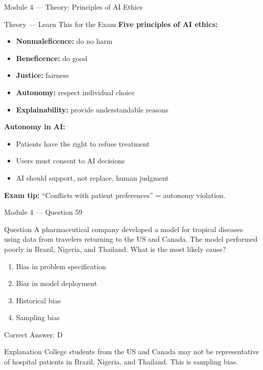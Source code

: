 \documentclass[aspectratio=169,10pt]{beamer}
\newcommand{\question}[1]{%
	\begin{block}{Question}
		#1
	\end{block}
}
\newcommand{\options}[4]{%
	\begin{enumerate}[label=\Alph*.,leftmargin=*]
		\item #1
		\item #2
		\item #3
		\item #4
	\end{enumerate}
}
\newcommand{\answerbox}[1]{%
	\begin{exampleblock}{Correct Answer: #1}
	\end{exampleblock}
}
\newcommand{\explain}[1]{%
	\begin{block}{Explanation}
		\small #1
	\end{block}
}
\newcommand{\theory}[1]{%
	\begin{block}{Theory --- Learn This for the Exam}
		\small #1
	\end{block}
}
\begin{document}
	\begin{frame}{Module 4 --- Theory: Principles of AI Ethics}
		\theory{
			\textbf{Five principles of AI ethics:}
			\begin{itemize}
				\item \textbf{Nonmaleficence:} do no harm
				\item \textbf{Beneficence:} do good
				\item \textbf{Justice:} fairness
				\item \textbf{Autonomy:} respect individual choice
				\item \textbf{Explainability:} provide understandable reasons
			\end{itemize}
			\textbf{Autonomy in AI:}
			\begin{itemize}
				\item Patients have the right to refuse treatment
				\item Users must consent to AI decisions
				\item AI should support, not replace, human judgment
			\end{itemize}
			\textbf{Exam tip:} ``Conflicts with patient preferences'' = autonomy violation.
		}
	\end{frame}
	
	\begin{frame}{Module 4 --- Question 59}
		\question{A pharmaceutical company developed a model for tropical diseases using data from travelers returning to the US and Canada. The model performed poorly in Brazil, Nigeria, and Thailand. What is the most likely cause?}
		\options{Bias in problem specification}{Bias in model deployment}{Historical bias}{Sampling bias}
		\answerbox{D}
		\explain{College students from the US and Canada may not be representative of hospital patients in Brazil, Nigeria, and Thailand. This is sampling bias.}
	\end{frame}
	
\end{document}
